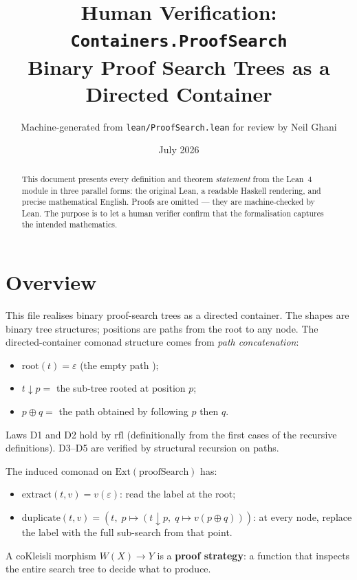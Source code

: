 \documentclass[11pt,a4paper]{article}
\title{Human Verification: \texttt{Containers.ProofSearch}\\[4pt]
  \large Binary Proof Search Trees as a Directed Container}
\author{Machine-generated from \texttt{lean/ProofSearch.lean} for review by Neil Ghani}
\date{July 2026}
\begin{document}
\maketitle

\begin{abstract}
This document presents every definition and theorem \emph{statement} from the
Lean~4 module  in three parallel forms: the
original Lean, a readable Haskell rendering, and precise mathematical English.
Proofs are omitted --- they are machine-checked by Lean.  The purpose is to
let a human verifier confirm that the formalisation captures the intended
mathematics.
\end{abstract}

\tableofcontents
\bigskip

\section{Overview}

This file realises binary proof-search trees as a directed container.  The
shapes are binary tree structures; positions are paths from the root to any
node.  The directed-container comonad structure comes from \emph{path
concatenation}:
\begin{itemize}
  \item $\mathrm{root}(t) = \varepsilon$ (the empty path );
  \item $t \downarrow p = $ the sub-tree rooted at position $p$;
  \item $p \oplus q = $ the path obtained by following $p$ then $q$.
\end{itemize}

Laws D1 and D2 hold by $\mathrm{rfl}$ (definitionally from the first cases
of the recursive definitions).  D3--D5 are verified by structural recursion
on paths.

The induced comonad on $\mathrm{Ext}(\mathrm{proofSearch})$ has:
\begin{itemize}
  \item $\mathrm{extract}(t, v) = v(\varepsilon)$: read the label at the root;
  \item $\mathrm{duplicate}(t, v) = (t,\; p \mapsto (t \downarrow p,\; q \mapsto v(p \oplus q)))$:
        at every node, replace the label with the full sub-search from that point.
\end{itemize}
A coKleisli morphism $W(X) \to Y$ is a \textbf{proof strategy}: a function
that inspects the entire search tree to decide what to produce.
\end{document}

